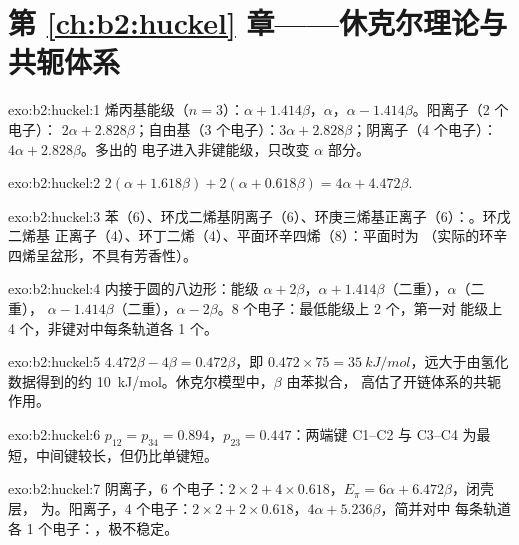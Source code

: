\section*{第 \ref{ch:b2:huckel} 章——休克尔理论与共轭体系}

\begin{solution}{exo:b2:huckel:1}
烯丙基能级（$n = 3$）：$\alpha + 1.414\beta$，$\alpha$，$\alpha - 1.414\beta$。阳离子（2 个电子）：
$2\alpha + 2.828\beta$；自由基（3 个电子）：$3\alpha + 2.828\beta$；阴离子（4 个电子）：$4\alpha + 2.828\beta$。多出的
电子进入非键能级，只改变 $\alpha$ 部分。
\end{solution}

\begin{solution}{exo:b2:huckel:2}
$2(\alpha + 1.618\beta) + 2(\alpha + 0.618\beta) = 4\alpha + 4.472\beta$.
\end{solution}

\begin{solution}{exo:b2:huckel:3}
苯（6）、环戊二烯基阴离子（6）、环庚三烯基正离子（6）：。环戊二烯基
正离子（4）、环丁二烯（4）、平面环辛四烯（8）：平面时为
（实际的环辛四烯呈盆形，不具有芳香性）。
\end{solution}

\begin{solution}{exo:b2:huckel:4}
内接于圆的八边形：能级 $\alpha + 2\beta$，$\alpha + 1.414\beta$（二重），$\alpha$（二重），
$\alpha - 1.414\beta$（二重），$\alpha - 2\beta$。8 个电子：最低能级上 2 个，第一对
能级上 4 个，非键对中每条轨道各 1 个。
\end{solution}

\begin{solution}{exo:b2:huckel:5}
$4.472\beta - 4\beta = 0.472\beta$，即 $0.472 \times 75 = \qty{35}{kJ/mol}$，远大于由氢化数据得到的约
\qty{10}{kJ/mol}。休克尔模型中，$\beta$ 由苯拟合，
高估了开链体系的共轭作用。
\end{solution}

\begin{solution}{exo:b2:huckel:6}
$p_{12} = p_{34} = 0.894$，$p_{23} = 0.447$：两端键 C1--C2 与 C3--C4 为最
短，中间键较长，但仍比单键短。
\end{solution}

\begin{solution}{exo:b2:huckel:7}
阴离子，6 个电子：$2 \times 2 + 4 \times 0.618$，$E_\pi = 6\alpha + 6.472\beta$，闭壳层，
为。阳离子，4 个电子：$2 \times 2 + 2 \times 0.618$，$4\alpha + 5.236\beta$，简并对中
每条轨道各 1 个电子：，极不稳定。
\end{solution}

